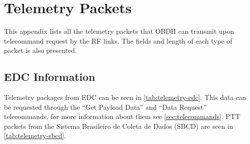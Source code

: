 %
%
%
%
%

%
%
%
%
%
%

\chapter{Telemetry Packets} \label{anx:telemetry-apx}

This appendix lists all the telemetry packets that OBDH can transmit upon telecommand request by the RF links. The fields and length of each type of packet is also presented.

\section{EDC Information}

Telemetry packages from EDC can be seen in \autoref{tab:telemetry-edc}. This data can be requested through the ``Get Payload Data'' and ``Data Request'' telecommands, for more information about them see \autoref{sec:telecommands}.
PTT packets from the Sistema Brasileiro de Coleta de Dados (SBCD) are seen in \autoref{tab:telemetry-sbcd}.

